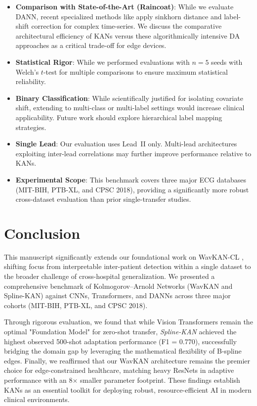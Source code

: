 \documentclass[journal,twoside,web]{ieeecolor}
\begin{document}
\begin{itemize}
    \item \textbf{Comparison with State-of-the-Art (Raincoat)}: While we evaluate DANN, recent specialized methods like  \cite{raincoat2023} apply sinkhorn distance and label-shift correction for complex time-series. We discuss the comparative architectural efficiency of KANs versus these algorithmically intensive DA approaches as a critical trade-off for edge devices.
    \item \textbf{Statistical Rigor}: While we performed evaluations with $n=5$ seeds with Welch's $t$-test for multiple comparisons to ensure maximum statistical reliability.
    \item \textbf{Binary Classification}: While scientifically justified for isolating covariate shift, extending to multi-class or multi-label settings would increase clinical applicability. Future work should explore hierarchical label mapping strategies.
    \item \textbf{Single Lead}: Our evaluation uses Lead~II only. Multi-lead architectures exploiting inter-lead correlations may further improve performance relative to KANs.
    \item \textbf{Experimental Scope}: This benchmark covers three major ECG databases (MIT-BIH, PTB-XL, and CPSC 2018), providing a significantly more robust cross-dataset evaluation than prior single-transfer studies.
\end{itemize}



\section{Conclusion}

This manuscript significantly extends our foundational work on WavKAN-CL \cite{manivannan2024wavkancl}, shifting focus from interpretable inter-patient detection within a single dataset to the broader challenge of cross-hospital generalization. We presented a comprehensive benchmark of Kolmogorov--Arnold Networks (WavKAN and Spline-KAN) against CNNs, Transformers, and DANNs across three major cohorts (MIT-BIH, PTB-XL, and CPSC 2018).

Through rigorous evaluation, we found that while Vision Transformers remain the optimal "Foundation Model" for zero-shot transfer, \textit{Spline-KAN} achieved the highest observed 500-shot adaptation performance (F1 = 0.770), successfully bridging the domain gap by leveraging the mathematical flexibility of B-spline edges. Finally, we reaffirmed that our WavKAN architecture remains the premier choice for edge-constrained healthcare, matching heavy ResNets in adaptive performance with an 8$\times$ smaller parameter footprint. These findings establish KANs as an essential toolkit for deploying robust, resource-efficient AI in modern clinical environments.
\end{document}
